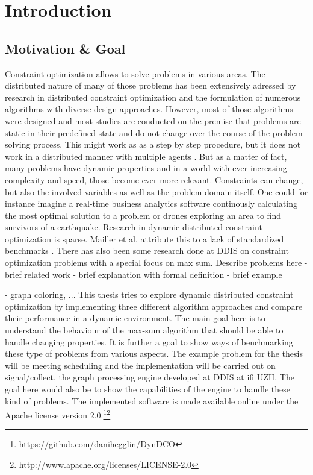 \chapter{Introduction}

\section{Motivation \& Goal}
Constraint optimization allows to solve problems in various areas. The distributed nature of  many of those problems has been extensively adressed by research in distributed constraint optimization and the formulation of numerous algorithms with diverse design approaches. However, most of those algorithms were designed and most studies are conducted on the premise that problems are static in their predefined state and do not change over the course of the problem solving process. This might work as as a step by step procedure, but it does not work in a distributed manner with multiple agents \cite{Petcu2007}. But as a matter of fact, many problems have dynamic properties and in a world with ever increasing complexity and speed, those become ever more relevant. Constraints can change, but also the involved variables as well as the problem domain itself. One could for instance imagine a real-time business analytics software continously calculating the most optimal solution to a problem or drones exploring an area to find survivors of a earthquake. Research in dynamic distributed constraint optimization is sparse. Mailler et al. attribute this to a lack of standardized benchmarks \cite{Mailler2014}. There has also been some research done at DDIS on constraint optimization problems with a special focus on max sum.
\newline \newline
Describe problems here
    - brief related work
    - brief explanation with formal definition
    - brief example
    
    - graph coloring, ...
\newline \newline
This thesis tries to explore dynamic distributed constraint optimization by implementing three different algorithm approaches and compare their performance in a dynamic environment. The main goal here is to understand the behaviour of the max-sum algorithm that should be able to handle changing properties. It is further a goal to show ways of benchmarking these type of problems from various aspects. The example problem for the thesis will be meeting scheduling and the implementation will be carried out on signal/collect, the graph processing engine developed at  DDIS at ifi UZH. The goal here would also be to show the capabilities of the engine to handle these kind of problems. 
\newline \newline
The implemented software is made available online under the Apache license version 2.0.\footnote{https://github.com/danihegglin/DynDCO}\footnote{http://www.apache.org/licenses/LICENSE-2.0}

